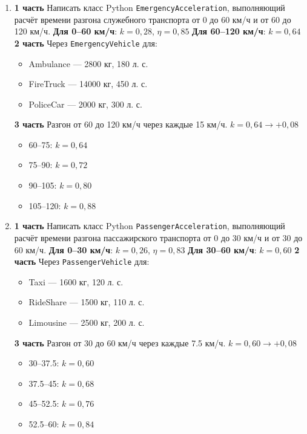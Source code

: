 \begin{enumerate}
    \item[13] \textbf{1 часть}  
    Написать класс Python \texttt{EmergencyAcceleration}, выполняющий расчёт времени разгона служебного транспорта от 0 до 60 км/ч и от 60 до 120 км/ч.  
    \textbf{Для 0–60 км/ч}: $k = 0{,}28$, $\eta = 0{,}85$  
    \textbf{Для 60–120 км/ч}: $k = 0{,}64$  
    \textbf{2 часть}  
    Через \texttt{EmergencyVehicle} для:  
    \begin{itemize}
        \item Ambulance — 2800 кг, 180 л. с.  
        \item FireTruck — 14000 кг, 450 л. с.  
        \item PoliceCar — 2000 кг, 300 л. с.  
    \end{itemize}
    \textbf{3 часть}  
    Разгон от 60 до 120 км/ч через каждые 15 км/ч. $k = 0{,}64 \to +0{,}08$  
    \begin{itemize}
        \item 60–75: $k = 0{,}64$  
        \item 75–90: $k = 0{,}72$  
        \item 90–105: $k = 0{,}80$  
        \item 105–120: $k = 0{,}88$  
    \end{itemize}

    \item[14] \textbf{1 часть}  
    Написать класс Python \texttt{PassengerAcceleration}, выполняющий расчёт времени разгона пассажирского транспорта от 0 до 30 км/ч и от 30 до 60 км/ч.  
    \textbf{Для 0–30 км/ч}: $k = 0{,}26$, $\eta = 0{,}83$  
    \textbf{Для 30–60 км/ч}: $k = 0{,}60$  
    \textbf{2 часть}  
    Через \texttt{PassengerVehicle} для:  
    \begin{itemize}
        \item Taxi — 1600 кг, 120 л. с.  
        \item RideShare — 1500 кг, 110 л. с.  
        \item Limousine — 2500 кг, 200 л. с.  
    \end{itemize}
    \textbf{3 часть}  
    Разгон от 30 до 60 км/ч через каждые 7.5 км/ч. $k = 0{,}60 \to +0{,}08$  
    \begin{itemize}
        \item 30–37.5: $k = 0{,}60$  
        \item 37.5–45: $k = 0{,}68$  
        \item 45–52.5: $k = 0{,}76$  
        \item 52.5–60: $k = 0{,}84$  
    \end{itemize}


\end{enumerate}
